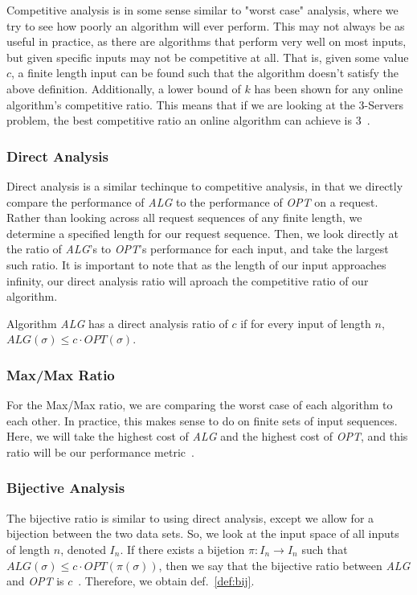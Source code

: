 Competitive analysis is in some sense similar to "worst case" analysis, where we try to see how poorly an algorithm will ever perform. This may not always be as useful in practice, as there are algorithms that perform very well on most inputs, but given specific inputs may not be competitive at all. That is, given some value $c$, a finite length input can be found such that the algorithm doesn't satisfy the above definition. Additionally, a lower bound of $k$ has been shown for any online algorithm's competitive ratio. This means that if we are looking at the 3-Servers problem, the best competitive ratio an online algorithm can achieve is 3~\cite{OnlineComp1998}. 

\subsubsection*{Direct Analysis}
\label{sec:Direct}
Direct analysis is a similar techinque to competitive analysis, in that we directly compare the performance of \textit{ALG} to the performance of \textit{OPT} on a request. Rather than looking across all request sequences of any finite length, we determine a specified length for our request sequence. Then, we look directly at the ratio of \textit{ALG}'s to \textit{OPT}'s performance for each input, and take the largest such ratio. It is important to note that as the length of our input approaches infinity, our direct analysis ratio will aproach the competitive ratio of our algorithm.

\begin{definition}
    \label{def:direct}
    Algorithm \textit{ALG} has a direct analysis ratio of $c$ if for every input \s of length $n$, $ALG(\sigma) \leq c\cdot OPT(\sigma)$.
\end{definition}

\subsubsection*{Max/Max Ratio}
\label{sec:MaxMax}
For the Max/Max ratio, we are comparing the worst case of each algorithm to each other. In practice, this makes sense to do on finite sets of input sequences. Here, we will take the highest cost of \textit{ALG} and the highest cost of \textit{OPT}, and this ratio will be our performance metric~\cite{MAXMAX2005}. 

\subsubsection*{Bijective Analysis}
\label{sec:Bij}
The bijective ratio is similar to using direct analysis, except we allow for a bijection between the two data sets. So, we look at the input space of all inputs of length $n$, denoted $I_n$. If there exists a bijetion $\pi:I_n \rightarrow I_n$ such that $ALG(\sigma) \leq c\cdot OPT(\pi(\sigma))$, then  we say that the bijective ratio between \textit{ALG} and \textit{OPT} is $c$~\cite{bij2016}. Therefore, we obtain def.~\ref{def:bij}. 

